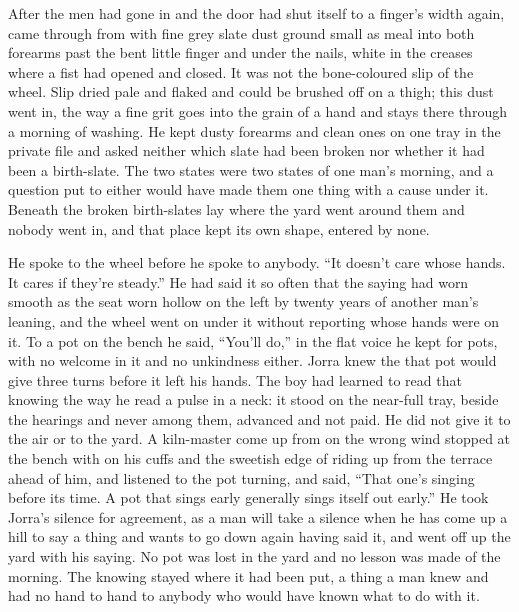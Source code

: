 \scenebreak

After the men had gone in and the door had shut itself to a finger's width again,  came through from  with fine grey slate dust ground small as meal into both forearms past the bent little finger and under the nails, white in the creases where a fist had opened and closed. It was not the bone-coloured slip of the wheel. Slip dried pale and flaked and could be brushed off on a thigh; this dust went in, the way a fine grit goes into the grain of a hand and stays there through a morning of washing. He kept dusty forearms and clean ones on one tray in the private file and asked neither which slate had been broken nor whether it had been a birth-slate. The two states were two states of one man's morning, and a question put to either would have made them one thing with a cause under it. Beneath  the broken birth-slates lay where the yard went around them and nobody went in, and that place kept its own shape, entered by none.

He spoke to the wheel before he spoke to anybody. “It doesn't care whose hands. It cares if they're steady.” He had said it so often that the saying had worn smooth as the seat worn hollow on the left by twenty years of another man's leaning, and the wheel went on under it without reporting whose hands were on it. To a pot on the bench he said, “You'll do,” in the flat voice he kept for pots, with no welcome in it and no unkindness either. Jorra knew the  that pot would give three turns before it left his hands. The boy had learned to read that knowing the way he read a pulse in a neck: it stood on the near-full tray, beside the hearings and never among them, advanced and not paid. He did not give it to the air or to the yard. A kiln-master come up from  on the wrong wind stopped at the bench with  on his cuffs and the sweetish edge of  riding up from the terrace ahead of him, and listened to the pot turning, and said, “That one's singing before its time. A pot that sings early generally sings itself out early.” He took Jorra's silence for agreement, as a man will take a silence when he has come up a hill to say a thing and wants to go down again having said it, and went off up the yard with his saying. No pot was lost in the yard and no lesson was made of the morning. The knowing stayed where it had been put, a thing a man knew and had no hand to hand to anybody who would have known what to do with it.

